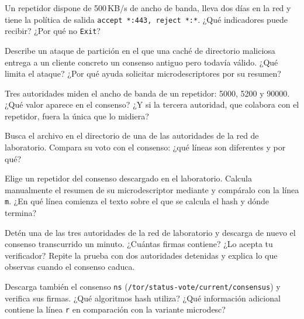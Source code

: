 \begin{esercizio}[1]\label{es:12-flag}
Un repetidor dispone de 500\,KB/s de ancho de banda, lleva dos días en la red y tiene la política de salida \texttt{accept *:443, reject *:*}. ¿Qué indicadores puede recibir? ¿Por qué no \texttt{Exit}?
\end{esercizio}

\begin{esercizio}[2]\label{es:12-partizione}
Describe un ataque de partición en el que una caché de directorio maliciosa entrega a un cliente concreto un consenso antiguo pero todavía válido. ¿Qué limita el ataque? ¿Por qué ayuda solicitar microdescriptores por su resumen?
\end{esercizio}

\begin{esercizio}[2]\label{es:12-mediana}
Tres autoridades miden el ancho de banda de un repetidor: 5000, 5200 y 90000. ¿Qué valor aparece en el consenso? ¿Y si la tercera autoridad, que colabora con el repetidor, fuera la única que lo midiera?
\end{esercizio}

\begin{esercizio}[2]\label{es:12-voti}
Busca el archivo  en el directorio de una de las autoridades de la red de laboratorio. Compara su voto con el consenso: ¿qué líneas son diferentes y por qué?
\end{esercizio}

\begin{esercizio}[2]\label{es:12-md}
Elige un repetidor del consenso descargado en el laboratorio. Calcula manualmente el resumen de su microdescriptor mediante  y compáralo con la línea \texttt{m}. ¿En qué línea comienza el texto sobre el que se calcula el hash y dónde termina?
\end{esercizio}

\begin{esercizio}[3]\label{es:12-autorita}
Detén una de las tres autoridades de la red de laboratorio y descarga de nuevo el consenso transcurrido un minuto. ¿Cuántas firmas contiene? ¿Lo acepta tu verificador? Repite la prueba con dos autoridades detenidas y explica lo que observas cuando el consenso caduca.
\end{esercizio}

\begin{esercizio}[3]\label{es:12-ns}
Descarga también el consenso \texttt{ns} (\nolinkurl{/tor/status-vote/current/consensus}) y verifica sus firmas. ¿Qué algoritmos hash utiliza? ¿Qué información adicional contiene la línea \texttt{r} en comparación con la variante microdesc?
\end{esercizio}

